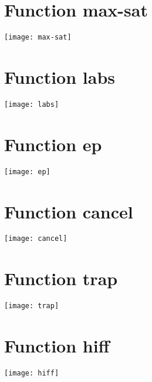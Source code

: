 \section{Function max-sat}
\begin{center}

\end{center}
\begin{center}
\texttt{[image: max-sat]}
\end{center}
\newpage
\section{Function labs}
\begin{center}

\end{center}
\begin{center}
\texttt{[image: labs]}
\end{center}
\newpage
\section{Function ep}
\begin{center}

\end{center}
\begin{center}
\texttt{[image: ep]}
\end{center}
\newpage
\section{Function cancel}
\begin{center}

\end{center}
\begin{center}
\texttt{[image: cancel]}
\end{center}
\newpage
\section{Function trap}
\begin{center}

\end{center}
\begin{center}
\texttt{[image: trap]}
\end{center}
\newpage
\section{Function hiff}
\begin{center}

\end{center}
\begin{center}
\texttt{[image: hiff]}
\end{center}
\newpage
